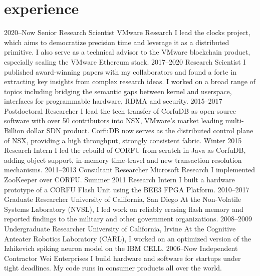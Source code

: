 \section{experience}

\begin{entrylist}
\entry
{2020--Now}
{Senior Research Scientist}
{VMware Research}
{\small I lead the clocks project, which aims to democratize precision time and leverage it as a distributed primitive.
I also serve as a technical advisor to the VMware blockchain product, especially scaling the VMware Ethereum stack.}
\entry
{2017--2020}
{Research Scientist}
{}
{\small I published award-winning papers with my collaborators and found a forte in extracting 
 key insights from complex research ideas. I worked on a broad range of topics including
 bridging the semantic gaps between kernel and userspace, interfaces for programmable hardware, 
 RDMA and security. }
\entry
{2015--2017}
{Postdoctoral Researcher}
{}
{\small I lead the tech transfer of CorfuDB as open-source software with over 50 contributors into NSX, VMware's market leading multi-Billion dollar SDN product. 
CorfuDB now serves as the distributed control plane of NSX, providing a high throughput, strongly consistent fabric.}
\entry
{Winter 2015}
{Research Intern}
{}
{\small I led the rebuild of CORFU from scratch in Java as CorfuDB, adding object support, in-memory time-travel and new transaction resolution mechanisms.}
\entry
{2011--2013}
{Consultant Researcher}
{Microsoft Research}
{\small I implemented ZooKeeper over CORFU.}
\entry
{Summer 2011}
{Research Intern}
{}
{\small I built a hardware prototype of a CORFU Flash Unit using the BEE3 FPGA Platform.}
\entry
{2010--2017}
{Graduate Researcher}
{University of California, San Diego}
{\small At the Non-Volatile Systems Laboratory (NVSL), I led work on reliably erasing flash memory and reported findings to the military and other government organizations.}
\entry
{2008--2009}
{Undergraduate Researcher}
{University of California, Irvine}
{\small At the Cognitive Anteater Robotics Laboratory (CARL), I worked on an optimized version of the Izhikevich spiking neuron model on the IBM CELL.}
\entry
{2006--Now}
{Independent Contractor}
{Wei Enterprises}
{\small I build hardware and software for startups under tight deadlines. My code runs in consumer products all over the world.}
\end{entrylist}